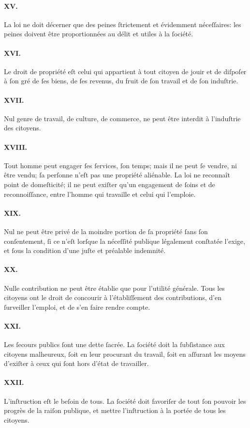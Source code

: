 \documentclass[10pt]{article}
\begin{document}
\paragraph*{XV.}La loi ne doit décerner que des peines ſtrictement et évidemment néceſſaires: les peines doivent être proportionnées au délit et utiles à la ſociété.
\paragraph*{XVI.}Le droit de propriété eſt celui qui appartient à tout citoyen de jouir et de diſpoſer à ſon gré de ſes biens, de ſes revenus, du fruit de ſon travail et de ſon induſtrie.
\paragraph*{XVII.}Nul genre de travail, de culture, de commerce, ne peut être interdit à l'induſtrie des citoyens.
\paragraph*{XVIII.}Tout homme peut engager ſes ſervices, ſon temps; mais il ne peut ſe vendre, ni être vendu; ſa perſonne n'eſt pas une propriété aliénable. La loi ne reconnaît point de domeſticité; il ne peut exiſter qu'un engagement de ſoins et de reconnoiſſance, entre l'homme qui travaille et celui qui l'emploie.
\paragraph*{XIX.}Nul ne peut être privé de la moindre portion de ſa propriété ſans ſon conſentement, ſi ce n'eſt lorſque la néceſſité publique légalement conſtatée l'exige, et ſous la condition d'une juſte et préalable indemnité.
\paragraph*{XX.}Nulle contribution ne peut être établie que pour l'utilité générale. Tous les citoyens ont le droit de concourir à l'établiſſement des contributions, d'en ſurveiller l'emploi, et de s'en faire rendre compte.
\paragraph*{XXI.}Les ſecours publics ſont une dette ſacrée. La ſociété doit la ſubſistance aux citoyens malheureux, ſoit en leur procurant du travail, ſoit en aſſurant les moyens d'exiſter à ceux qui ſont hors d'état de travailler.
\paragraph*{XXII.}L'inſtruction eſt le beſoin de tous. La ſociété doit favoriſer de tout ſon pouvoir les progrès de la raiſon publique, et mettre l'inſtruction à la portée de tous les citoyens.
\end{document}
